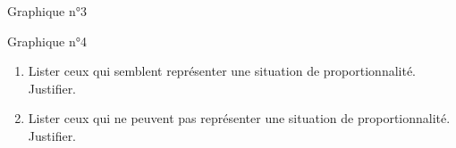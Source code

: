 \begin{exercice*}
\begin{multicols}{2}
\begin{center}
{            }
            {\sc Graphique n°3}
            \par\medskip\par
            \scalebox{0.5}{
                \Fonction[%
                    Trace,%
                    Xmin=0,Xmax=5,Xstep=2,%
                    Ymin=0,Ymax=5,Ystep=2,%
                    Origine={(0,0)},%
                    Grille,PasGrilleX=0.5,PasGrilleY=0.5,%
                    Bornea=0,Borneb=0,%
                    Traces={
                            marque_p:="croix";
                            pointe(placepoint(2,1.5),placepoint(4,3),placepoint(6,4.5),placepoint(10,7.5),);
                    },%
                ]{}
            }
            {\sc Graphique n°4}
        \end{center}
    \end{multicols}
    \begin{enumerate}
        \item Lister ceux qui semblent représenter une situation de proportionnalité. Justifier.
        \item Lister ceux qui ne peuvent pas représenter une situation de proportionnalité. Justifier.
    \end{enumerate}
\end{exercice*}
